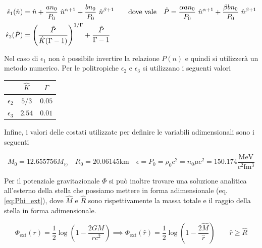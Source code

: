 \documentclass[a4paper, titlepage]{article}
\newcommand{\Punit}[0]{\frac{\unit{\mega\electronvolt}}{c^2 \unit{\femto\cubic\meter}}}
\begin{document}
\begin{subequations}
\begin{align}
    \hat \epsilon_1 (\hat n) &= \hat n + \frac{a n_0}{P_0} ~ \hat n^{\alpha + 1}
    + \frac{b n_0}{P_0} ~ \hat n^{\beta + 1}
    \quad \quad {\rm dove~vale} \quad
    \hat P = \frac{\alpha a n_0}{P_0} ~ \hat n^{\alpha + 1}
    + \frac{\beta b n_0}{P_0} ~ \hat n^{\beta + 1} \label{eq:e1_ad} \\
    \hat \epsilon_2 (\hat P)
    &= \left(\frac{\hat P}{\hat K (\Gamma - 1)} \right)^{1/\Gamma}
    + \frac{\hat P}{\Gamma - 1} \label{eq:e23_ad}
\end{align}
\end{subequations}

Nel caso di $\epsilon_1$ non è possibile invertire la relazione $P(n)$ e quindi
si utilizzerà un metodo numerico.
Per le politropiche $\epsilon_2$ e $\epsilon_3$ si utilizzano i seguenti valori

\begin{table}[h]
    \centering
    \begin{tabular}{c|c|c} 
         & $\hat K$ & $\Gamma$ \\
        \hline
        $\epsilon_2$ & $5 / 3$ & $0.05$ \\
        \hline
        $\epsilon_3$ & $2.54$ & $0.01$ \\
    \end{tabular}
\end{table}

Infine, i valori delle costati utilizzate per definire le variabili
adimensionali sono i seguenti

\begin{equation}
    M_0 = 12.655756 M_\odot \quad R_0 = 20.06145 \unit{\kilo\meter} \quad
    \epsilon = P_0 = \rho_0 c^2 = n_0 \mu c^2 = 150.174 \Punit
    \label{eq:val_cost}
\end{equation}

Per il potenziale gravitazionale $\Phi$ si può inoltre trovare una soluzione
analitica all'esterno della stella che possiamo mettere in forma adimensionale
(eq. \ref{eq:Phi_ext}), dove $\hat{M}$ e $\hat R$ sono rispettivamente la massa
totale e il raggio della stella in forma adimensionale.

\begin{equation}
    \Phi_\text{ext} (r) = \frac{1}{2} \log(1 - \frac{2 G M}{r c^2})
    \implies \Phi_\text{ext} (\hat r) = \frac{1}{2}
    \log(1 - \frac{2 \hat{M}}{\hat r}) \quad \quad \hat r \geq \hat{R}
    \label{eq:Phi_ext}
\end{equation}
\end{document}

